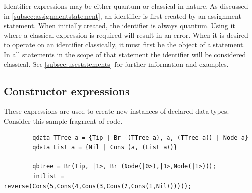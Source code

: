 Identifier expressions may be either quantum or classical in nature. 
As discussed in \vref{subsec:assignmentstatement}, an identifier is 
first created by an assignment statement. When initially created, the
identifier is always quantum. Using it where a classical expression is 
required will result in an error. When it is desired to operate on an
identifier classically, it must first be the object 
of a   statement.
In all statements in the scope of that  statement
the identifier will be considered classical. See \vref{subsec:usestatements}
for further information and examples.

\subsection{Constructor expressions}\label{subsec:constructorexpressions}
These expressions are used to create new instances of declared data types.
Consider this sample fragment of code.

{\begin{singlespace}
\begin{lstlisting}
        qdata TTree a = {Tip | Br ((TTree a), a, (TTree a)) | Node a}
        qdata List a = {Nil | Cons (a, (List a))}

        qbtree = Br(Tip, |1>, Br (Node(|0>),|1>,Node(|1>)));
        intlist = reverse(Cons(5,Cons(4,Cons(3,Cons(2,Cons(1,Nil))))));
\end{lstlisting}
\end{singlespace}
}

